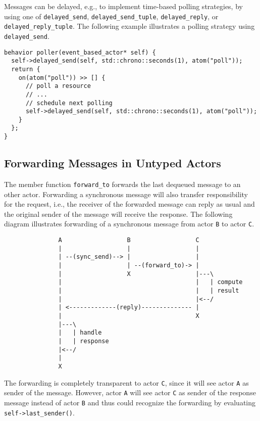 Messages can be delayed, e.g., to implement time-based polling strategies, by using one of \lstinline^delayed_send^, \lstinline^delayed_send_tuple^, \lstinline^delayed_reply^, or \lstinline^delayed_reply_tuple^.
The following example illustrates a polling strategy using \lstinline^delayed_send^.

\begin{lstlisting}
behavior poller(event_based_actor* self) {
  self->delayed_send(self, std::chrono::seconds(1), atom("poll"));
  return {
    on(atom("poll")) >> [] {
      // poll a resource
      // ...
      // schedule next polling
      self->delayed_send(self, std::chrono::seconds(1), atom("poll"));
    }
  };
}
\end{lstlisting}

\clearpage
\subsection{Forwarding Messages in Untyped Actors}

The member function \lstinline^forward_to^ forwards the last dequeued message to an other actor.
Forwarding a synchronous message will also transfer responsibility for the request, i.e., the receiver of the forwarded message can reply as usual and the original sender of the message will receive the response.
The following diagram illustrates forwarding of a synchronous message from actor \texttt{B} to actor \texttt{C}.

\begin{footnotesize}
\begin{verbatim}
               A                  B                  C
               |                  |                  |
               | --(sync_send)--> |                  |
               |                  | --(forward_to)-> |
               |                  X                  |---\
               |                                     |   | compute
               |                                     |   | result
               |                                     |<--/
               | <-------------(reply)-------------- |
               |                                     X
               |---\
               |   | handle
               |   | response
               |<--/
               |
               X
\end{verbatim}
\end{footnotesize}

The forwarding is completely transparent to actor \texttt{C}, since it will see actor \texttt{A} as sender of the message.
However, actor \texttt{A} will see actor \texttt{C} as sender of the response message instead of actor \texttt{B} and thus could recognize the forwarding by evaluating \lstinline^self->last_sender()^.